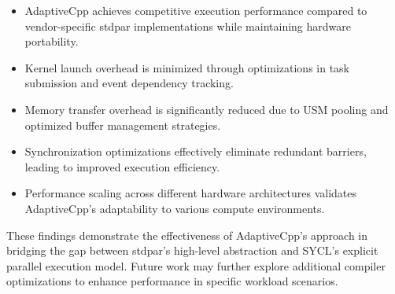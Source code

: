 \begin{itemize}
    \item AdaptiveCpp achieves competitive execution performance compared to vendor-specific stdpar
          implementations while maintaining hardware portability.
    \item Kernel launch overhead is minimized through optimizations in task submission and event dependency
          tracking.
    \item Memory transfer overhead is significantly reduced due to USM pooling and optimized buffer
          management strategies.
    \item Synchronization optimizations effectively eliminate redundant barriers, leading to improved
          execution efficiency.
    \item Performance scaling across different hardware architectures validates AdaptiveCpp’s adaptability
          to various compute environments.
\end{itemize}

These findings demonstrate the effectiveness of AdaptiveCpp’s approach in bridging the gap between stdpar’s
high-level abstraction and SYCL’s explicit parallel execution model. Future work may further explore additional
compiler optimizations to enhance performance in specific workload scenarios.
